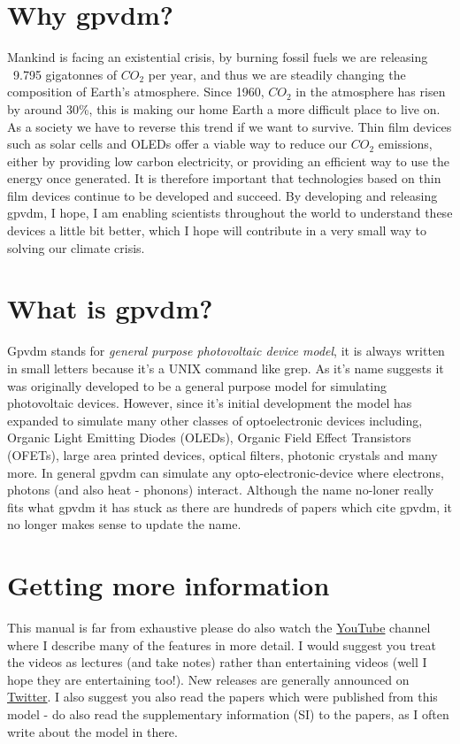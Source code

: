 \section{Why gpvdm?}
Mankind is facing an existential crisis, by burning fossil fuels we are releasing ~9.795 gigatonnes of $CO_2$ per year, and thus we are steadily changing the composition of Earth's atmosphere. Since 1960, $CO_{2}$ in the atmosphere has risen by around 30\%, this is making our home Earth a more difficult place to live on. As a society we have to reverse this trend if we want to survive. Thin film devices such as solar cells and OLEDs offer a viable way to reduce our $CO_{2}$ emissions, either by providing low carbon electricity, or providing an efficient way to use the energy once generated. It is therefore important that technologies based on thin film devices continue to be developed and succeed. By developing and releasing gpvdm, I hope, I am enabling scientists throughout the world to understand these devices a little bit better, which I hope will contribute in a very small way to solving our climate crisis.

\section{What is gpvdm?} 
Gpvdm stands for \emph{general purpose photovoltaic device model}, it is always written in small letters because it's a UNIX command like grep.  As it's name suggests it was originally developed to be a general purpose model for simulating photovoltaic devices. However, since it's initial development the model has expanded to simulate many other classes of optoelectronic devices including, Organic Light Emitting Diodes (OLEDs), Organic Field Effect Transistors (OFETs), large area printed devices, optical filters, photonic crystals and many more.  In general gpvdm can simulate any opto-electronic-device where electrons, photons (and also heat - phonons) interact.  Although the name no-loner really fits what gpvdm it has stuck as there are hundreds of papers which cite gpvdm, it no longer makes sense to update the name.

\section{Getting more information}
This manual is far from exhaustive please do also watch the \href{https://www.youtube.com/channel/UCbm_0AKX1SpbMMT7jilxFfA}{YouTube} channel where I describe many of the features in more detail. I would suggest you treat the videos as lectures (and take notes) rather than entertaining videos (well I hope they are entertaining too!). New releases are generally announced on \href{https://twitter.com/gpvdm_info}{Twitter}.  I also suggest you also read the papers which were published from this model - do also read the supplementary information (SI) to the papers, as I often write about the model in there.

